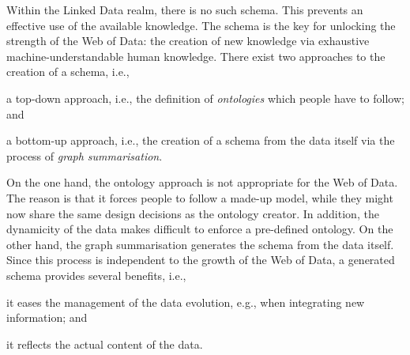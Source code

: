 Within the Linked Data realm, there is no such schema. This prevents an effective use of the available knowledge. The schema is the key for unlocking the strength of the Web of Data: the creation of new knowledge via exhaustive machine-understandable human knowledge. There exist two approaches to the creation of a schema, i.e.,
\begin{inparaenum}[(1)]
\item a top-down approach, i.e., the definition of \emph{ontologies} which people have to follow; and
\item a bottom-up approach, i.e., the creation of a schema from the data itself via the process of \emph{graph summarisation}.
\end{inparaenum}
On the one hand, the ontology approach is not appropriate for the Web of Data. The reason is that it forces people to follow a made-up model, while they might now share the same design decisions as the ontology creator. In addition, the dynamicity of the data makes difficult to enforce a pre-defined ontology. On the other hand, the graph summarisation generates the schema from the data itself. Since this process is independent to the growth of the Web of Data, a generated schema provides several benefits, i.e.,
\begin{inparaenum}[(1)]
\item it eases the management of the data evolution, e.g., when integrating new information; and
\item it reflects the actual content of the data.
\end{inparaenum}
